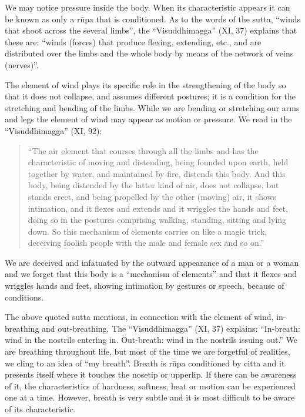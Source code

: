 \documentclass{book}
\begin{document}
We may notice pressure inside the body. When its characteristic appears
it can be known as only a r\=upa that is conditioned. As to the words
of the sutta, ``winds that shoot across the several limbs'', the
``Visuddhimagga'' (XI, 37) explains that these are: ``winds (forces)
that produce flexing, extending, etc., and are distributed over the
limbs and the whole body by means of the network of veins (nerves)''. 

The element of wind plays its specific role in the strengthening of the
body so that it does not collapse, and assumes different postures; it
is a condition for the stretching and bending of the limbs. While we
are bending or stretching our arms and legs the element of wind may
appear as motion or pressure. We read in the ``Visuddhimagga'' (XI,
92):




\begin{quote}\begin{flushleft}
``The air element that courses through all the limbs and has the
characteristic of moving and distending, being founded upon earth, held
together by water, and maintained by fire, distends this body. And this
body, being distended by the latter kind of air, does not collapse, but stands
erect, and being propelled by the other (moving) air, it shows
intimation, and it flexes and extends and it wriggles the hands and
feet, doing so in the postures comprising walking, standing, sitting
and lying down. So this mechanism of elements carries on like a magic
trick, deceiving foolish people with the male and female sex and so
on.''
\end{flushleft}\end{quote}




We are deceived and infatuated by the outward appearance of a man or a
woman and we forget that this body is a ``mechanism of elements'' and
that it flexes and wriggles hands and feet, showing intimation by
gestures or speech, because of conditions.

The above quoted sutta mentions, in connection with the element of wind,
in-breathing and out-breathing. The ``Visuddhimagga'' (XI, 37)
explains: ``In-breath: wind in the nostrils entering in.
Out-breath: wind in the nostrils issuing out.'' We are breathing
throughout life, but most of the time we are forgetful of realities, we
cling to an idea of ``my breath''. Breath is r\=upa conditioned by
citta and it presents itself where it touches the nosetip or upperlip.
If there can be awareness of it, the characteristics of hardness,
softness, heat or motion can be experienced one at a time. However,
breath is very subtle and it is most difficult to be aware of its
characteristic. 
\end{document}
